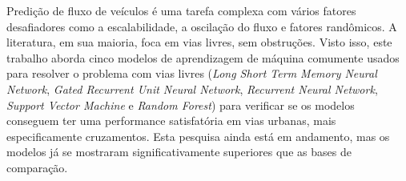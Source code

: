 Predição de fluxo de veículos é uma tarefa complexa com vários fatores desafiadores como a escalabilidade, a oscilação do fluxo e fatores randômicos. A literatura, em sua maioria, foca em vias livres, sem obstruções. Visto isso, este trabalho aborda cinco modelos de aprendizagem de máquina comumente usados para resolver o problema com vias livres (\textit{Long Short Term Memory Neural Network}, \textit{Gated Recurrent Unit Neural Network}, \textit{Recurrent Neural Network}, \textit{Support Vector Machine} e \textit{Random Forest}) para verificar se os modelos conseguem ter uma performance satisfatória em vias urbanas, mais especificamente cruzamentos. Esta pesquisa ainda está em andamento, mas os modelos já se mostraram significativamente superiores que as bases de comparação.
